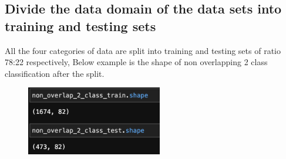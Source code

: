 \documentclass[conference]{IEEEtran}
\begin{document}
\subsection{Divide the data domain of the data sets into training and testing sets}
All the four categories of data are split into training and testing sets of ratio 78:22 respectively,
Below example is the shape of non overlapping 2 class classification after the split.
\begin{figure}[!htbp]
    \centering
    \includegraphics[height=3cm]{task1.2.png} 
   
    \label{fig:my_label}
\end{figure}
\end{document}
